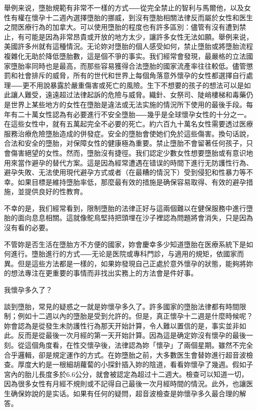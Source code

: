 \documentclass[12pt,UTF8]{ctexbook}
\begin{document}
舉例来说，墮胎規範有非常不一樣的方式⸺從完全禁止的智利与馬爾他，以及女性有權在懷孕十二週內選擇墮胎的挪威，到沒有墮胎相關法律反而屬於女性和医生之間医療行為的加拿大。可以使用墮胎的程度也有許多區別：儘管有沒有遭到禁止，有可能是因為非常昂貴或开放的地方太少，讓許多女性无法如願。舉例来说，美國許多州就有這種情況。无论妳对墮胎的個人感受如何，禁止墮胎或將墮胎流程複雜化无助於降低墮胎數，這是個不爭的事实。我们經常會發現，最嚴格的立法國家墮胎率同時也是最高，而那些容易獲得合法墮胎的國家流產率往往較低。儘管懲罰和社會排斥的威脅，所有的世代和世界上每個角落意外懷孕的女性都選擇自行處理⸺更不用說暴露於嚴重傷害或死亡的風險。生下不想要的孩子的想法可以是如此讓人難受，遠遠超过法律起訴的危險与威脅。織針、女祭司、陡峭樓梯和毒藥仍是世界上某些地方的女性在墮胎是違法或无法实施的情況所下使用的最後手段。每年有二十萬女性認為有必要進行不安全墮胎⸺幾乎是全球懷孕女性的十分之一。在這些女性中，就有五萬起完全不必要的死亡。約六百九十萬名女性需要透过医療服務治療危險墮胎造成的併發症。安全的墮胎會使她们免於這些傷害。換句话說，合法和安全的墮胎，对保障女性的健康極為重要。禁止墮胎不會留著任何孩子，只會傷害絕望的女性。然而，墮胎沒有捷徑。我们認定少數女性想要墮胎或有意识地用來當作避孕的替代方案。這是因為經常遭遇在错误的時間下進行无防護性行為、避孕失敗、无法使用現代避孕方式或者（在最糟的情況下）受到侵犯和性暴力等不幸。如果目標是維持墮胎率低，那麼最有效的措施是确保容易取得、有效的避孕措施，並提供良好的性教育。

不幸的是，我们經常看到，限制墮胎的法律正好与這兩個難以在健保服務中進行墮胎的面向息息相關。這就像鴕鳥堅持把頭埋在沙子裡認為問題將會消失，只是因為沒有看的必要。

不管妳是否生活在墮胎方不方便的國家，妳會慶幸多少知道墮胎在医療系統下是如何進行。墮胎進行的方式⸺无论是医院或專科門診，与適用的規矩，依國家而異。但是這些方法都是一樣的，如果妳發現自己正處於意外懷孕的狀態，能夠將妳的想法專注在更重要的事情而非找出实務上的方法會是件好事。





我懷孕多久了？

談到墮胎，常見的疑惑之一就是妳懷孕多久了。許多國家的墮胎法律都有時間限制；例如十二週以內的墮胎是受到允許的。但是，真正懷孕十二週是什麼時候呢？妳會認為是從發生未防護性行為那天开始計算，令人難以置信的是，事实並非如此。反而是從最後一次月經的第一天开始計算。因為這是确定妳沒有懷孕的最後一刻。從這個角度看，在性交懷孕後，法律認為妳「懷孕」了兩個星期。雖然不完全合乎邏輯，卻是規定運作的方式。在妳墮胎之前，大多數医生會替妳進行超音波檢查。厚度大約是一根細胡蘿蔔的小探針插入妳的陰道，看看妳懷孕了幾週。假如子宮內的胎儿長度多於6.6公分，就會被認定為超过十二週大。檢查可以知道一切，因為很多女性有月經不規則或不記得自己最後一次月經時間的情況。此外，也讓医生确保妳說的是实话。如果有任何的疑問，超音波檢查是妳懷孕多久最合理的解答。
\end{document}
